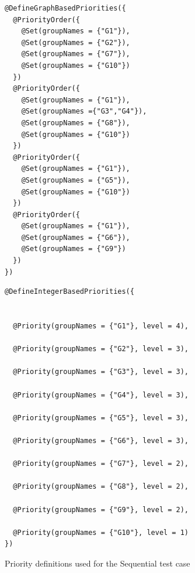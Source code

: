 \documentclass[11pt]{report}
\begin{document}
\begin{figure}[!ht]
	\lstset{language=java, numberstyle=\tiny, stepnumber=1, numbersep=5pt, basicstyle=\footnotesize}
	\begin{minipage}{0.41\textwidth}
	\begin{lstlisting}[frame=single]
@DefineGraphBasedPriorities({
  @PriorityOrder({
    @Set(groupNames = {"G1"}),
    @Set(groupNames = {"G2"}),
    @Set(groupNames = {"G7"}),
    @Set(groupNames = {"G10"})
  })
  @PriorityOrder({
    @Set(groupNames = {"G1"}),
    @Set(groupNames ={"G3","G4"}),
    @Set(groupNames = {"G8"}),
    @Set(groupNames = {"G10"})
  })
  @PriorityOrder({
    @Set(groupNames = {"G1"}),
    @Set(groupNames = {"G5"}),
    @Set(groupNames = {"G10"})
  })
  @PriorityOrder({
    @Set(groupNames = {"G1"}),
    @Set(groupNames = {"G6"}),
    @Set(groupNames = {"G9"})
  })
})
 	\end{lstlisting}
 	\end{minipage}
 	\nointerlineskip
	\begin{minipage}{0.57\textwidth}
	\begin{lstlisting}[frame=single]
@DefineIntegerBasedPriorities({


  @Priority(groupNames = {"G1"}, level = 4),
  
  @Priority(groupNames = {"G2"}, level = 3),
  
  @Priority(groupNames = {"G3"}, level = 3),
  
  @Priority(groupNames = {"G4"}, level = 3),
  
  @Priority(groupNames = {"G5"}, level = 3),
  
  @Priority(groupNames = {"G6"}, level = 3),
  
  @Priority(groupNames = {"G7"}, level = 2),
  
  @Priority(groupNames = {"G8"}, level = 2),
  
  @Priority(groupNames = {"G9"}, level = 2),
  
  @Priority(groupNames = {"G10"}, level = 1)
})
 	\end{lstlisting}
 	\end{minipage}	
	\caption{Priority definitions used for the Sequential test case}
	\label{fig:sequential}
\end{figure}
\end{document}
